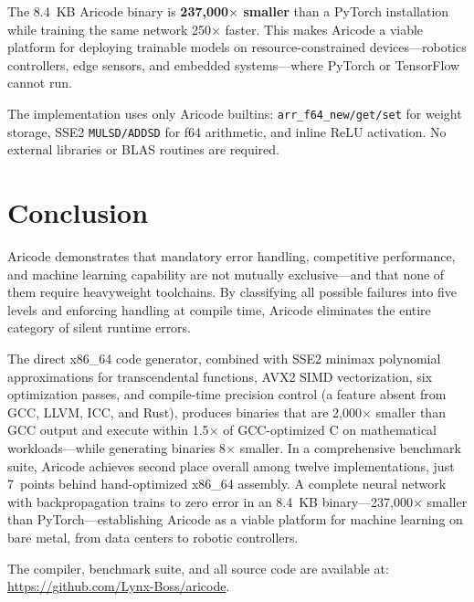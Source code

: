 \documentclass[11pt,a4paper]{article}
\begin{document}
The 8.4~KB Aricode binary is \textbf{237{,}000$\times$ smaller} than a PyTorch installation while training the same network 250$\times$ faster. This makes Aricode a viable platform for deploying trainable models on resource-constrained devices---robotics controllers, edge sensors, and embedded systems---where PyTorch or TensorFlow cannot run.

The implementation uses only Aricode builtins: \texttt{arr\_f64\_new/get/set} for weight storage, SSE2 \texttt{MULSD/ADDSD} for f64 arithmetic, and inline ReLU activation. No external libraries or BLAS routines are required.

\section{Conclusion}
\label{sec:conclusion}

Aricode demonstrates that mandatory error handling, competitive performance, and machine learning capability are not mutually exclusive---and that none of them require heavyweight toolchains. By classifying all possible failures into five levels and enforcing handling at compile time, Aricode eliminates the entire category of silent runtime errors.

The direct x86\_64 code generator, combined with SSE2 minimax polynomial approximations for transcendental functions, AVX2 SIMD vectorization, six optimization passes, and compile-time precision control (a feature absent from GCC, LLVM, ICC, and Rust), produces binaries that are 2{,}000$\times$ smaller than GCC output and execute within 1.5$\times$ of GCC-optimized C on mathematical workloads---while generating binaries 8$\times$ smaller. In a comprehensive benchmark suite, Aricode achieves second place overall among twelve implementations, just 7~points behind hand-optimized x86\_64 assembly. A complete neural network with backpropagation trains to zero error in an 8.4~KB binary---237{,}000$\times$ smaller than PyTorch---establishing Aricode as a viable platform for machine learning on bare metal, from data centers to robotic controllers.

The compiler, benchmark suite, and all source code are available at: \url{https://github.com/Lynx-Boss/aricode}.
\end{document}
